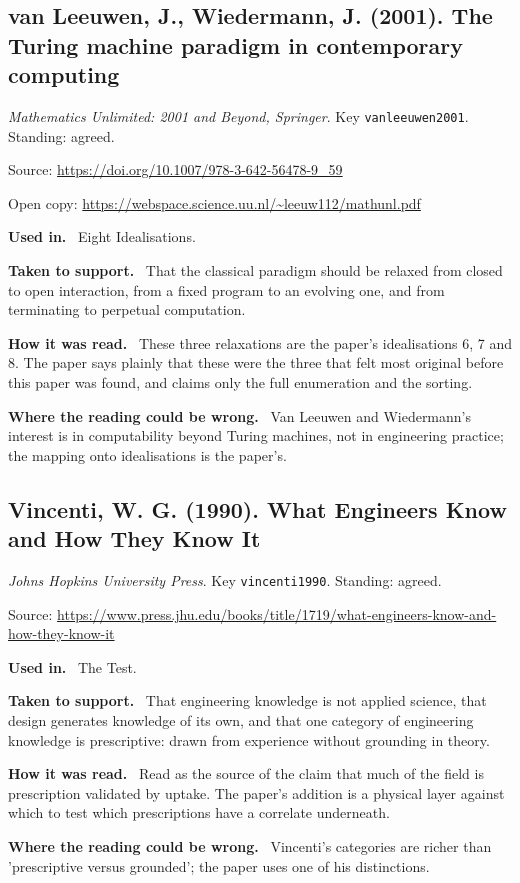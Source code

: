\documentclass[11pt,oneside]{article}
\newcommand{\field}[1]{\par\noindent\textbf{\color{accent}#1.}\ }
\begin{document}
\subsection*{van Leeuwen, J., Wiedermann, J. (2001). The Turing machine paradigm in contemporary computing}
\noindent\small\emph{Mathematics Unlimited: 2001 and Beyond, Springer}. Key \texttt{vanleeuwen2001}. Standing: agreed.
\par\noindent\small Source: \url{https://doi.org/10.1007/978-3-642-56478-9_59}
\par\noindent\small Open copy: \url{https://webspace.science.uu.nl/~leeuw112/mathunl.pdf}
\normalsize
\field{Used in} Eight Idealisations.
\field{Taken to support} That the classical paradigm should be relaxed from closed to open interaction, from a fixed program to an evolving one, and from terminating to perpetual computation.
\field{How it was read} These three relaxations are the paper's idealisations 6, 7 and 8. The paper says plainly that these were the three that felt most original before this paper was found, and claims only the full enumeration and the sorting.
\field{Where the reading could be wrong} Van Leeuwen and Wiedermann's interest is in computability beyond Turing machines, not in engineering practice; the mapping onto idealisations is the paper's.

\hypertarget{src:vincenti1990}{}
\subsection*{Vincenti, W. G. (1990). What Engineers Know and How They Know It}
\noindent\small\emph{Johns Hopkins University Press}. Key \texttt{vincenti1990}. Standing: agreed.
\par\noindent\small Source: \url{https://www.press.jhu.edu/books/title/1719/what-engineers-know-and-how-they-know-it}
\normalsize
\field{Used in} The Test.
\field{Taken to support} That engineering knowledge is not applied science, that design generates knowledge of its own, and that one category of engineering knowledge is prescriptive: drawn from experience without grounding in theory.
\field{How it was read} Read as the source of the claim that much of the field is prescription validated by uptake. The paper's addition is a physical layer against which to test which prescriptions have a correlate underneath.
\field{Where the reading could be wrong} Vincenti's categories are richer than 'prescriptive versus grounded'; the paper uses one of his distinctions.

\hypertarget{src:vonneumann1956}{}
\end{document}
